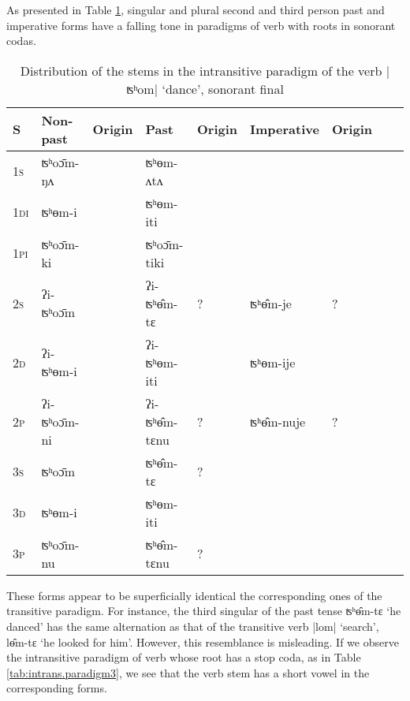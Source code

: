 \documentclass[oldfontcommands,oneside,a4paper,11pt]{article}
\newcommand{\ipa}[1]{{\phon \mbox{#1}}} %
\begin{document}
As presented in Table \ref{tab:intrans.paradigm2}, singular and plural second and third person past and imperative forms have a falling tone in paradigms of verb with roots in sonorant codas.

\begin{table}[h]
\caption{Distribution of the stems in the intransitive paradigm of the verb |ʦʰom| `dance', sonorant final} \label{tab:intrans.paradigm2} \centering
\begin{tabular}{lllllllll}
\toprule
S & Non-past & Origin & Past & Origin & Imperative & Origin \\
\midrule
\textsc{1s} & \ipa{ʦʰoɔ̄m-ŋʌ} & & \ipa{ʦʰɵm-ʌtʌ} &\\
\textsc{1di} & \ipa{ʦʰɵm-i} && \ipa{ʦʰɵm-iti}& \\
\textsc{1pi} & \ipa{ʦʰoɔ̄m-ki} && \ipa{ʦʰoɔ̄m-tiki} &&\\
\textsc{2s} & \ipa{ʔi-ʦʰoɔ̄m} & &\ipa{ʔi-ʦʰɵ̂m-tɛ}  &?&\ipa{ʦʰɵ̂m-je}&?\\
\textsc{2d} & \ipa{ʔi-ʦʰɵm-i}  & &\ipa{ʔi-ʦʰɵm-iti} &&\ipa{ʦʰɵm-ije} &\\
\textsc{2p} & \ipa{ʔi-ʦʰoɔ̄m-ni} && \ipa{ʔi-ʦʰɵ̂m-tɛnu} &?&\ipa{ʦʰɵ̂m-nuje}&?\\
\textsc{3s} & \ipa{ʦʰoɔ̄m} & &\ipa{ʦʰɵ̂m-tɛ} &?\\
\textsc{3d} & \ipa{ʦʰɵm-i} & &\ipa{ʦʰɵm-iti} &\\
\textsc{3p} & \ipa{ʦʰoɔ̄m-nu} && \ipa{ʦʰɵ̂m-tɛnu} &?\\
\bottomrule
\end{tabular}
\end{table}

These forms appear to be superficially identical the corresponding ones of the transitive paradigm. For instance, the third singular of the past tense \ipa{ʦʰɵ̂m-tɛ} `he danced' has the same alternation as that of the transitive verb |lom| `search', \ipa{lɵ̂m-tɛ} `he looked for him'. However, this resemblance is misleading. If we observe the intransitive paradigm of verb whose root has a stop coda, as in Table \ref{tab:intrans.paradigm3}, we see that the verb stem has a short vowel in the corresponding forms.
\end{document}
